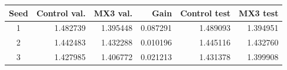 \begin{tabular}{crrrrr}
\toprule
Seed & Control val. & MX3 val. & Gain & Control test & MX3 test \\
\midrule
1 & 1.482739 & 1.395448 & 0.087291 & 1.489093 & 1.394951 \\
2 & 1.442483 & 1.432288 & 0.010196 & 1.445116 & 1.432760 \\
3 & 1.427985 & 1.406772 & 0.021213 & 1.431378 & 1.399908 \\
\bottomrule
\end{tabular}
